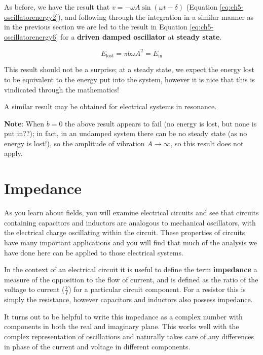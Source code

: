 \documentclass[
]{book}
\begin{document}
As before, we have the result that \(v = -\omega A \sin(\omega t - \delta)\) (Equation \eqref{eq:ch5-oscillatorenergy2}), and following through the integration in a similar manner as in the previous section we are led to the result in Equation \eqref{eq:ch5-oscillatorenergy6} for a \textbf{driven damped oscillator} at \textbf{steady state}.

\begin{equation}
E_{\mathrm{lost}}  = \pi b \omega A^2= E_{\mathrm{in}}
\label{eq:ch5-oscillatorenergy6}
\end{equation}

This result should not be a surprise; at a steady state, we expect the energy lost to be equivalent to the energy put into the system, however it is nice that this is vindicated through the mathematics!

A similar result may be obtained for electrical systems in resonance.

\textbf{Note}: When \(b = 0\) the above result appears to fail (no energy is lost, but none is put in??); in fact, in an undamped system there can be no steady state (as no energy is lost!), so the amplitude of vibration \(A \rightarrow \infty\), so this result does not apply.

\hypertarget{sec-ch5-impedance}{%
\section{Impedance}\label{sec-ch5-impedance}}

As you learn about fields, you will examine electrical circuits and see that circuits containing capacitors and inductors are analogous to mechanical oscillators, with the electrical charge oscillating within the circuit. These properties of circuits have many important applications and you will find that much of the analysis we have done here can be applied to those electrical systems.

In the context of an electrical circuit it is useful to define the term \textbf{impedance} a measure of the opposition to the flow of current, and is defined as the ratio of the voltage to current (\(\frac{V}{I}\)) for a particular circuit component. For a resistor this is simply the resistance, however capacitors and inductors also possess impedance.

It turns out to be helpful to write this impedance as a complex number with components in both the real and imaginary plane. This works well with the complex representation of oscillations and naturally takes care of any differences in phase of the current and voltage in different components.
\end{document}
